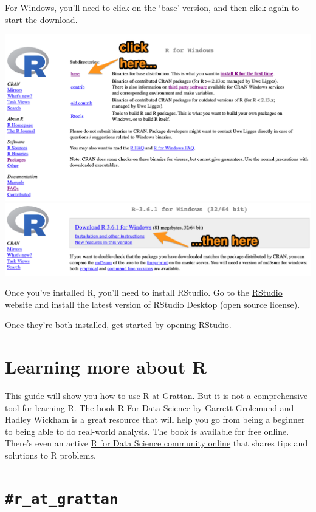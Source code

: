 \documentclass[
]{book}
\begin{document}
For Windows, you'll need to click on the `base' version, and then click again to start the download.

\includegraphics[width=15.69in]{atlas/r_cran_windows_1}
\includegraphics[width=15.67in]{atlas/r_cran_windows_2}

Once you've installed R, you'll need to install RStudio. Go to the \href{https://www.rstudio.com/products/rstudio/download/\#download}{RStudio website and install the latest version} of RStudio Desktop (open source license).

Once they're both installed, get started by opening RStudio.

\hypertarget{learning-more-about-r}{%
\section{Learning more about R}\label{learning-more-about-r}}

This guide will show you how to use R at Grattan. But it is not a comprehensive tool for learning R. The book \href{https://r4ds.had.co.nz}{R For Data Science} by Garrett Grolemund and Hadley Wickham is a great resource that will help you go from being a beginner to being able to do real-world analysis. The book is available for free online. There's even an active \href{https://www.rfordatasci.com}{R for Data Science community online} that shares tips and solutions to R problems.

\hypertarget{r_at_grattan}{%
\section{\texorpdfstring{\texttt{\#r\_at\_grattan}}{\#r\_at\_grattan}}\label{r_at_grattan}}
\end{document}
